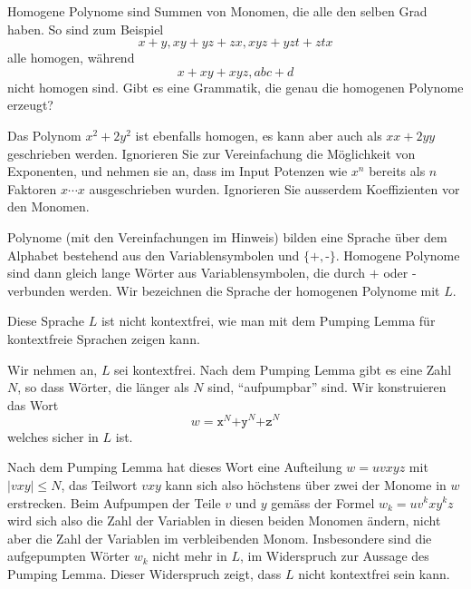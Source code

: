 Homogene Polynome sind Summen von Monomen, die alle den selben Grad haben.
So sind zum Beispiel 
\[
x+y, xy+yz+zx, xyz+yzt+ztx
\]
alle homogen, während
\[
x+xy+xyz, abc+d
\]
nicht homogen sind. Gibt es eine Grammatik, die genau die homogenen Polynome
erzeugt?

\begin{hinweis}
Das Polynom $x^2+2y^2$ ist ebenfalls homogen, es kann aber auch als $xx+2yy$
geschrieben werden. 
Ignorieren Sie zur Vereinfachung die Möglichkeit von Exponenten,
und nehmen sie an, dass im Input Potenzen wie $x^n$ bereits als
$n$ Faktoren $x\cdots x$ ausgeschrieben wurden.
Ignorieren Sie ausserdem Koeffizienten vor den Monomen.
\end{hinweis}

\begin{loesung}
Polynome (mit den Vereinfachungen im Hinweis) bilden eine Sprache
über dem Alphabet bestehend aus
den Variablensymbolen und $\{\texttt{+},\texttt{-}\}$.
Homogene Polynome sind
dann gleich lange Wörter aus Variablensymbolen, die durch
$\texttt{+}$ oder $\texttt{-}$ verbunden werden. Wir bezeichnen die
Sprache der homogenen Polynome mit $L$.

Diese Sprache $L$ ist nicht kontextfrei, wie man mit dem Pumping Lemma
für kontextfreie Sprachen zeigen kann.

Wir nehmen an, $L$ sei kontextfrei. Nach dem Pumping Lemma
gibt es eine Zahl $N$, so dass Wörter, die länger als $N$ sind,
``aufpumpbar'' sind. Wir konstruieren das Wort
\[
w=\texttt{x}^N\texttt{+y}^N\texttt{+z}^N
\]
welches sicher in $L$ ist.

Nach dem Pumping Lemma hat dieses Wort eine Aufteilung
$w=uvxyz$ mit $|vxy|\le N$, das Teilwort $vxy$ kann sich also 
höchstens über zwei der Monome in $w$ erstrecken.
Beim Aufpumpen der Teile $v$ und $y$ gemäss der Formel
$w_k=uv^kxy^kz$ wird sich also die Zahl der Variablen in diesen
beiden Monomen ändern, nicht aber die Zahl der Variablen im 
verbleibenden Monom. Insbesondere sind die aufgepumpten Wörter $w_k$
nicht mehr in $L$, im Widerspruch zur Aussage des Pumping Lemma.
Dieser Widerspruch zeigt, dass $L$ nicht kontextfrei sein kann.
\end{loesung}


